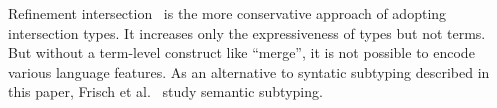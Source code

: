 

Refinement
intersection~\cite{dunfield2007refined,davies2005practical,freeman1991refinement}
is the more conservative approach of adopting intersection types. It increases
only the expressiveness of types but not terms. But without a term-level
construct like ``merge'', it is not possible to encode various language
features. As an alternative to syntatic subtyping described in this paper,
Frisch et al.~\cite{frisch2008semantic} study semantic subtyping.

